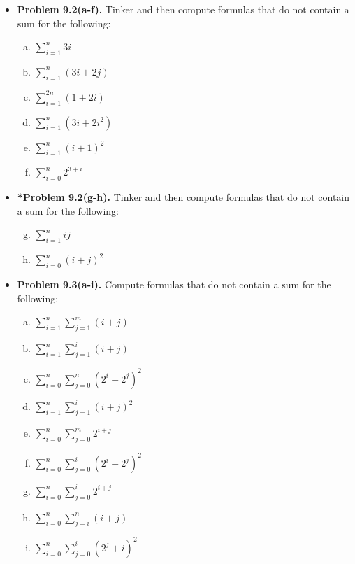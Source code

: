 \documentclass[11pt]{article}
\begin{document}
\begin{itemize}
\item \textbf{Problem 9.2(a-f).}
Tinker and then compute formulas that do not contain a sum for the following:
\begin{multicols}{3}
\begin{enumerate}[(a)]
\item $\displaystyle \sum_{i=1}^n 3i$
\item $\displaystyle \sum_{i=1}^n (3i+2j)$
\item $\displaystyle \sum_{i=1}^{2n} (1+2i)$
\item $\displaystyle \sum_{i=1}^n (3i+2i^2)$
\item $\displaystyle \sum_{i=1}^n (i+1)^2$
\item $\displaystyle \sum_{i=0}^n 2^{3+i}$
\end{enumerate}
\end{multicols}

\vspace{0.1in}

\item \textbf{*Problem 9.2(g-h).}
Tinker and then compute formulas that do not contain a sum for the following:
\begin{multicols}{3}
\begin{enumerate}[(a)]
\setcounter{enumi}{6}
\item $\displaystyle \sum_{i=1}^n ij$
\item $\displaystyle \sum_{i=0}^n (i+j)^2$
\end{enumerate}
\end{multicols}

\newpage

\item \textbf{Problem 9.3(a-i).}
Compute formulas that do not contain a sum for the following:
\begin{multicols}{3}
\begin{enumerate}[(a)]
\item $\displaystyle \sum_{i=1}^n \sum_{j=1}^m (i+j)$
\item $\displaystyle \sum_{i=1}^n \sum_{j=1}^i (i+j)$
\item $\displaystyle \sum_{i=0}^n \sum_{j=0}^n (2^i+2^j)^2$
\item $\displaystyle \sum_{i=1}^n \sum_{j=1}^i (i+j)^2$
\item $\displaystyle \sum_{i=0}^n \sum_{j=0}^m 2^{i+j}$
\item $\displaystyle \sum_{i=0}^n \sum_{j=0}^i (2^i+2^j)^2$
\item $\displaystyle \sum_{i=0}^n \sum_{j=0}^i 2^{i+j}$
\item $\displaystyle \sum_{i=0}^n \sum_{j=i}^n (i+j)$
\item $\displaystyle \sum_{i=0}^n \sum_{j=0}^i (2^j+i)^2$
\end{enumerate}
\end{multicols}


\end{itemize}
\end{document}
